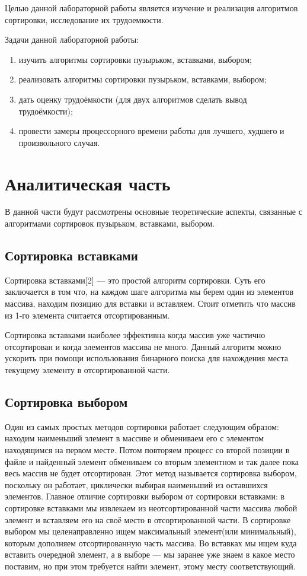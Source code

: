 \documentclass[a4paper,12pt]{article}
\begin{document}
	Целью данной лабораторной работы является изучение и реализация алгоритмов сортировки, исследование их трудоемкости.
	
	Задачи данной лабораторной работы:
	\begin{enumerate}
		\item изучить алгоритмы сортировки пузырьком, вставками, выбором;
		\item реализовать алгоритмы сортировки пузырьком, вставками, выбором;
		\item дать оценку трудоёмкости (для двух алгоритмов сделать вывод трудоёмкости);
		\item провести замеры процессорного времени работы для лучшего, худшего и произвольного случая.
	\end{enumerate}

	\newpage
	\section{Аналитическая часть}
	
	\hfill
	
	В данной части будут рассмотрены основные теоретические аспекты, связанные с алгоритмами сортировок пузырьком, вставками, выбором.
	
	\subsection{Сортировка вставками}
	\hfill
	
	Сортировка вставками[2] — это простой алгоритм сортировки. Суть его заключается в том что, на каждом шаге алгоритма мы берем один из элементов массива, находим позицию для вставки и вставляем. Стоит отметить что массив из 1-го элемента считается отсортированным.
	
	Сортировка вставками наиболее эффективна когда массив уже частично отсортирован и когда элементов массива не много. Данный алгоритм можно ускорить при помощи использования бинарного поиска для нахождения места текущему элементу в отсортированной части.
	
	\subsection{Сортировка выбором}
	\hfill

	Один из самых простых методов сортировки работает следующим образом: находим наименьший элемент в массиве и обмениваем его с элементом находящимся на первом месте. Потом повторяем процесс со второй позиции в файле и найденный элемент обмениваем со вторым элементном и так далее пока весь массив не будет отсортирован. Этот метод называется сортировка выбором, поскольку он работает, циклически выбирая наименьший из оставшихся элементов. Главное отличие сортировки выбором от сортировки вставками: в сортировке вставками мы извлекаем из неотсортированной части массива любой элемент и вставляем его на своё место в отсортированной части. В сортировке выбором мы целенаправленно ищем максимальный элемент(или минимальный), которым дополняем отсортированную часть массива. Во вставках мы ищем куда вставить очередной элемент, а в выборе — мы заранее уже знаем в какое место поставим, но при этом требуется найти элемент, этому месту соответствующий.
	
\end{document}
